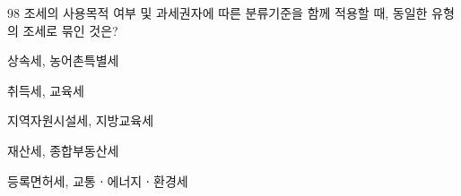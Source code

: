 \begin{question}{98}
조세의 사용목적 여부 및 과세권자에 따른 분류기준을 함께 적용할 때, 동일한 유형의 조세로 묶인 것은?
\begin{choices}
  \item 상속세, 농어촌특별세
  \item 취득세, 교육세
  \item 지역자원시설세, 지방교육세
  \item 재산세, 종합부동산세
  \item 등록면허세, 교통ㆍ에너지ㆍ환경세
\end{choices}
\end{question}
